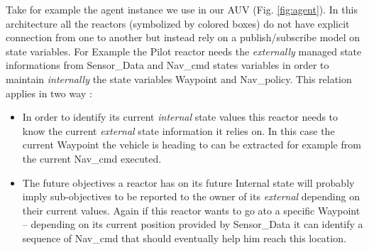 
Take for example the \rx agent instance we use in our AUV
(Fig. \ref{fig:agent}). In this architecture all the reactors
(symbolized by colored boxes) do not have explicit connection from one
to another but instead rely on a publish/subscribe model on state
variables. For Example the \textsf{Pilot} reactor needs the {\em
  externally} managed state informations from \textsf{Sensor\_Data}
and \textsf{Nav\_cmd} states variables in order to maintain {\em
  internally} the state variables \textsf{Waypoint} and
\textsf{Nav\_policy}. This relation applies in two way :

\begin{itemize}

\item In order to identify its current {\em internal} state values
  this reactor needs to know the current {\em external} state
  information it relies on. In this case the current \textsf{Waypoint}
  the vehicle is heading to can be extracted for example from the
  current \textsf{Nav\_cmd} executed.

\item The future objectives a reactor has on its future \textsf{Internal}
  state will probably imply sub-objectives to be reported to the
  owner of its {\em external} depending on their current values. Again
  if this reactor wants to go ato a specific \textsf{Waypoint} --
  depending on its current position provided by \textsf{Sensor\_Data}
  it can identify a sequence of \textsf{Nav\_cmd} that should
  eventually help him reach this location.

\end{itemize}

